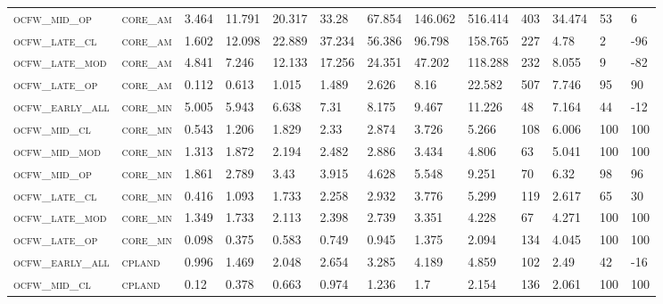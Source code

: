 \begin{landscape}
\begin{center}
\begin{footnotesize}
\begin{longtable}{lllllllllllll}
\textsc{ocfw\_mid\_op   } & \textsc{core\_am  }   & 3.464    & 11.791   & 20.317   & 33.28    & 67.854   & 146.062  & 516.414  & 403 & 34.474   & 53  & 6    \\
\textsc{ocfw\_late\_cl  } & \textsc{core\_am  }   & 1.602    & 12.098   & 22.889   & 37.234   & 56.386   & 96.798   & 158.765  & 227 & 4.78     & 2   & -96  \\
\textsc{ocfw\_late\_mod } & \textsc{core\_am  }   & 4.841    & 7.246    & 12.133   & 17.256   & 24.351   & 47.202   & 118.288  & 232 & 8.055    & 9   & -82  \\
\textsc{ocfw\_late\_op  } & \textsc{core\_am  }   & 0.112    & 0.613    & 1.015    & 1.489    & 2.626    & 8.16     & 22.582   & 507 & 7.746    & 95  & 90   \\
\textsc{ocfw\_early\_all} & \textsc{core\_mn  }   & 5.005    & 5.943    & 6.638    & 7.31     & 8.175    & 9.467    & 11.226   & 48  & 7.164    & 44  & -12  \\
\textsc{ocfw\_mid\_cl   } & \textsc{core\_mn  }   & 0.543    & 1.206    & 1.829    & 2.33     & 2.874    & 3.726    & 5.266    & 108 & 6.006    & 100 & 100  \\
\textsc{ocfw\_mid\_mod  } & \textsc{core\_mn  }   & 1.313    & 1.872    & 2.194    & 2.482    & 2.886    & 3.434    & 4.806    & 63  & 5.041    & 100 & 100  \\
\textsc{ocfw\_mid\_op   } & \textsc{core\_mn  }   & 1.861    & 2.789    & 3.43     & 3.915    & 4.628    & 5.548    & 9.251    & 70  & 6.32     & 98  & 96   \\
\textsc{ocfw\_late\_cl  } & \textsc{core\_mn  }   & 0.416    & 1.093    & 1.733    & 2.258    & 2.932    & 3.776    & 5.299    & 119 & 2.617    & 65  & 30   \\
\textsc{ocfw\_late\_mod } & \textsc{core\_mn  }   & 1.349    & 1.733    & 2.113    & 2.398    & 2.739    & 3.351    & 4.228    & 67  & 4.271    & 100 & 100  \\
\textsc{ocfw\_late\_op  } & \textsc{core\_mn  }   & 0.098    & 0.375    & 0.583    & 0.749    & 0.945    & 1.375    & 2.094    & 134 & 4.045    & 100 & 100  \\
\textsc{ocfw\_early\_all} & \textsc{cpland    }   & 0.996    & 1.469    & 2.048    & 2.654    & 3.285    & 4.189    & 4.859    & 102 & 2.49     & 42  & -16  \\
\textsc{ocfw\_mid\_cl   } & \textsc{cpland    }   & 0.12     & 0.378    & 0.663    & 0.974    & 1.236    & 1.7      & 2.154    & 136 & 2.061    & 100 & 100  \\

\end{longtable}
\end{footnotesize}
\end{center}
\end{landscape}

